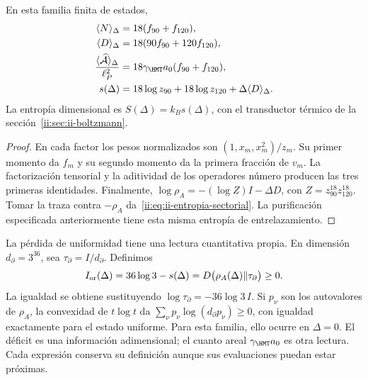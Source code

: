 \begin{proposition}
En esta familia finita de estados,
\begin{align}
 \langle N\rangle_\Delta&=18(f_{90}+f_{120}),\\
 \langle D\rangle_\Delta&=18(90f_{90}+120f_{120}),\\
 \frac{\langle\widehat{\mathcal A}\rangle_\Delta}{\ell_P^2}
 &=18\gamma_{\HMT}a_0(f_{90}+f_{120}),
 \label{ii:eq:ii-area-media}\\
 s(\Delta)&=18\log z_{90}+18\log z_{120}
                  +\Delta\langle D\rangle_\Delta.
 \label{ii:eq:ii-entropia-sectorial}
\end{align}
La entropía dimensional es $S(\Delta)=k_Bs(\Delta)$, con el
transductor térmico de la sección~\ref{ii:sec:ii-boltzmann}.
\end{proposition}
\begin{proof}
En cada factor los pesos normalizados son
$(1,x_m,x_m^2)/z_m$. Su primer momento da $f_m$ y su segundo
momento da la primera fracción de $v_m$. La factorización tensorial
y la aditividad de los operadores número producen las tres primeras
identidades. Finalmente,
$\log\rho_A=-(\log Z)I-\Delta D$, con
$Z=z_{90}^{18}z_{120}^{18}$. Tomar la traza contra $-\rho_A$
da~\eqref{ii:eq:ii-entropia-sectorial}. La purificación especificada
anteriormente tiene esta misma entropía de entrelazamiento.
\end{proof}

La pérdida de uniformidad tiene una lectura cuantitativa propia.
En dimensión \(d_\partial=3^{36}\), sea
\(\tau_\partial=I/d_\partial\). Definimos
\begin{equation}
 I_{\rm or}(\Delta)=36\log3-s(\Delta)
 =D\bigl(\rho_A(\Delta)\Vert\tau_\partial\bigr)\ge0.
 \label{ii:eq:ii-area-deficit-informacional}
\end{equation}
La igualdad se obtiene sustituyendo
\(\log\tau_\partial=-36\log3\,I\). Si \(p_\nu\) son los
autovalores de \(\rho_A\), la convexidad de \(t\log t\) da
\(\sum_\nu p_\nu\log(d_\partial p_\nu)\ge0\), con igualdad
exactamente para el estado uniforme. Para esta familia, ello ocurre en
\(\Delta=0\). El déficit es una información adimensional; el cuanto
areal \(\gamma_{\HMT}a_0\) es otra lectura. Cada expresión conserva
su definición aunque sus evaluaciones puedan estar próximas.

